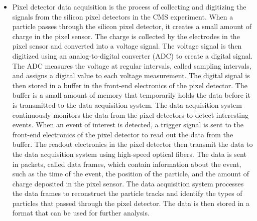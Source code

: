 \begin{itemize}

\item Pixel detector data acquisition is the process of collecting and digitizing the signals from the silicon pixel detectors in the CMS experiment. When a particle passes through the silicon pixel detector, it creates a small amount of charge in the pixel sensor. The charge is collected by the electrodes in the pixel sensor and converted into a voltage signal. The voltage signal is then digitized using an analog-to-digital converter (ADC) to create a digital signal. The ADC measures the voltage at regular intervals, called sampling intervals, and assigns a digital value to each voltage measurement. The digital signal is then stored in a buffer in the front-end electronics of the pixel detector. The buffer is a small amount of memory that temporarily holds the data before it is transmitted to the data acquisition system. The data acquisition system continuously monitors the data from the pixel detectors to detect interesting events. When an event of interest is detected, a trigger signal is sent to the front-end electronics of the pixel detector to read out the data from the buffer. The readout electronics in the pixel detector then transmit the data to the data acquisition system using high-speed optical fibers. The data is sent in packets, called data frames, which contain information about the event, such as the time of the event, the position of the particle, and the amount of charge deposited in the pixel sensor. The data acquisition system processes the data frames to reconstruct the particle tracks and identify the types of particles that passed through the pixel detector. The data is then stored in a format that can be used for further analysis.


\end{itemize}
